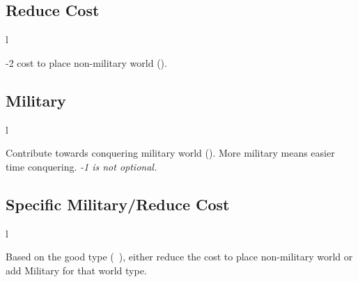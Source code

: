 \documentclass[letterpaper,landscape,twocolumn,8pt]{extarticle}
\newcommand{\inline}[1]{\scalerel*{#1}{M}}
\begin{document}
\begin{minipage}[t]{0.31\columnwidth}
\RaggedRight{}
\subsection*{Reduce Cost}
\setlength{\intextsep}{0pt}%

\begin{wrapfigure}{l}{\columnwidth}
    
\end{wrapfigure}

-2 cost to place non-military world
(\inline{}).
\subsection*{Military}
\begin{wrapfigure}{l}{\columnwidth}
    
    
\end{wrapfigure}

Contribute towards conquering military world
(\inline{}). More military means
easier time conquering.
\smallbreak{}
\textit{-1 is not optional.}
\subsection*{Specific Military/Reduce Cost}

\begin{wrapfigure}{l}{\columnwidth}
    
    
\end{wrapfigure}

Based on the good type
\mbox{(\inline{}
\inline{}
\inline{}
\inline{})}, either reduce
the cost to place non-military world or add Military for that world type.

\end{minipage}
\end{document}
